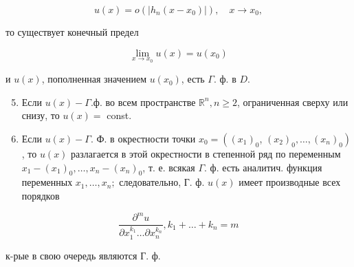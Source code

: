 \documentclass[10pt]{article}
\begin{document}
\[

u(x)=o\left(\left|h_{n}\left(x-x_{0}\right)\right|\right), \quad x \longrightarrow x_{0},

\]



то существует конечный предел



\[

\lim _{x \rightarrow x_{0}} u(x)=u\left(x_{0}\right)

\]



и $u(x)$, пополненная значением $u\left(x_{0}\right)$, есть $\Gamma$. ф. в $D$.



\begin{enumerate}

  \setcounter{enumi}{4}

  \item Если $u(x)-\Gamma . ф$. во всем пространстве $\mathbb{R}^{n}, n \geqslant 2$, ограниченная сверху или снизу, то $u(x)=$ const.



  \item Если $u(x)-\Gamma$. Ф. в окрестности точки $x_{0}=\left(\left(x_{1}\right)_{0}\right.$, $\left.\left(x_{2}\right)_{0}, \ldots,\left(x_{n}\right)_{0}\right)$, то $u(x)$ разлагается в этой окрестности в степенной ряд по переменным $x_{1}-\left(x_{1}\right)_{0}, \ldots, x_{n}-\left(x_{n}\right)_{0}$, т. е. всякая $\Gamma$. ф. есть аналитич. функция переменных $x_{1}, \ldots, x_{n} ;$ следовательно, Г. ф. $u(x)$ имеет производные всех порядков



\end{enumerate}



\[

\frac{\partial^{m} u}{\partial x_{1}^{k_{1}} \ldots \partial x_{n}^{k_{n}}}, k_{1}+\ldots+k_{n}=m

\]



к-рые в свою очередь являются Г. ф.
\end{document}
